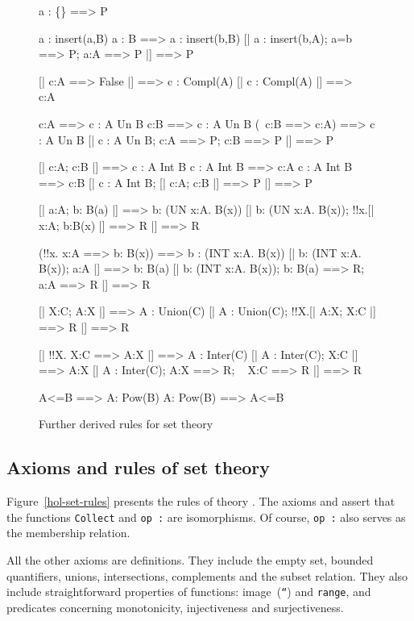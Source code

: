 \begin{figure} \underscoreon
\begin{ttbox}
   a : \{\} ==> P

 a : insert(a,B)
 a : B ==> a : insert(b,B)
  [| a : insert(b,A);  a=b ==> P;  a:A ==> P |] ==> P

   [| c:A ==> False |] ==> c : Compl(A)
   [| c : Compl(A) |] ==> ~ c:A

     c:A ==> c : A Un B
     c:B ==> c : A Un B
     (~c:B ==> c:A) ==> c : A Un B
      [| c : A Un B;  c:A ==> P;  c:B ==> P |] ==> P

     [| c:A;  c:B |] ==> c : A Int B
    c : A Int B ==> c:A
    c : A Int B ==> c:B
     [| c : A Int B;  [| c:A; c:B |] ==> P |] ==> P

     [| a:A;  b: B(a) |] ==> b: (UN x:A. B(x))
     [| b: (UN x:A. B(x));  !!x.[| x:A;  b:B(x) |] ==> R |] ==> R

    (!!x. x:A ==> b: B(x)) ==> b : (INT x:A. B(x))
    [| b: (INT x:A. B(x));  a:A |] ==> b: B(a)
    [| b: (INT x:A. B(x));  b: B(a) ==> R;  ~ a:A ==> R |] ==> R

   [| X:C;  A:X |] ==> A : Union(C)
   [| A : Union(C);  !!X.[| A:X;  X:C |] ==> R |] ==> R

   [| !!X. X:C ==> A:X |] ==> A : Inter(C)
   [| A : Inter(C);  X:C |] ==> A:X
   [| A : Inter(C);  A:X ==> R;  ~ X:C ==> R |] ==> R

     A<=B ==> A: Pow(B)
     A: Pow(B) ==> A<=B
\end{ttbox}
\caption{Further derived rules for set theory} \label{hol-set2}
\end{figure}


\subsection{Axioms and rules of set theory}
Figure~\ref{hol-set-rules} presents the rules of theory .  The
axioms  and  assert
that the functions {\tt Collect} and \hbox{\tt op :} are isomorphisms.  Of
course, \hbox{\tt op :} also serves as the membership relation.

All the other axioms are definitions.  They include the empty set, bounded
quantifiers, unions, intersections, complements and the subset relation.
They also include straightforward properties of functions: image~({\tt``}) and
{\tt range}, and predicates concerning monotonicity, injectiveness and
surjectiveness.  

